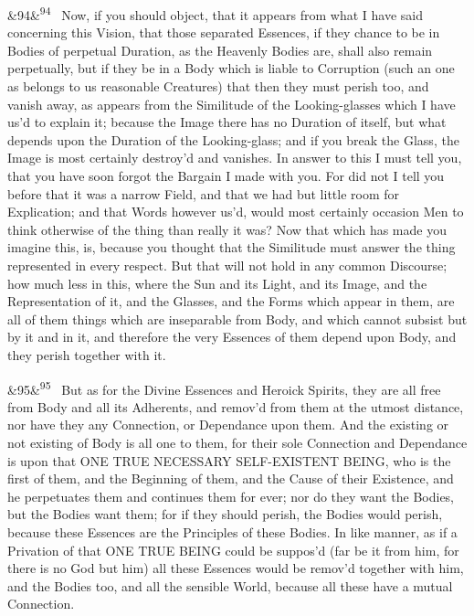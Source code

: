 \documentclass[12pt]{article}
\newcommand{\para}[1][]{\par\noindent\ifx&#1&\else\textsuperscript{\footnotesize #1}~\fi}
\begin{document}
\para[94] Now, if you should object, that it appears from what I have said concerning this Vision, that those separated Essences, if they chance to be in Bodies of perpetual Duration, as the Heavenly Bodies are, shall also remain perpetually, but if they be in a Body which is liable to Corruption (such an one as belongs to us reasonable Creatures) that then they must perish too, and vanish away, as appears from the Similitude of the Looking-glasses which I have us'd to explain it; because the Image there has no Duration of itself, but what depends upon the Duration of the Looking-glass; and if you break the Glass, the Image is most certainly destroy'd and vanishes. In answer to this I must tell you, that you have soon forgot the Bargain I made with you. For did not I tell you before that it was a narrow Field, and that we had but little room for Explication; and that Words however us'd, would most certainly occasion Men to think otherwise of the thing than really it was? Now that which has made you imagine this, is, because you thought that the Similitude must answer the thing represented in every respect. But that will not hold in any common Discourse; how much less in this, where the Sun and its Light, and its Image, and the Representation of it, and the Glasses, and the Forms which appear in them, are all of them things which are inseparable from Body, and which cannot subsist but by it and in it, and therefore the very Essences of them depend upon Body, and they perish together with it.

\para[95] But as for the Divine Essences and Heroick Spirits, they are all free from Body and all its Adherents, and remov'd from them at the utmost distance, nor have they any Connection, or Dependance upon them. And the existing or not existing of Body is all one to them, for their sole Connection and Dependance is upon that ONE TRUE NECESSARY SELF-EXISTENT BEING, who is the first of them, and the Beginning of them, and the Cause of their Existence, and he perpetuates them and continues them for ever; nor do they want the Bodies, but the Bodies want them; for if they should perish, the Bodies would perish, because these Essences are the Principles of these Bodies. In like manner, as if a Privation of that ONE TRUE BEING could be suppos'd (far be it from him, for there is no God but him) all these Essences would be remov'd together with him, and the Bodies too, and all the sensible World, because all these have a mutual Connection.
\end{document}
